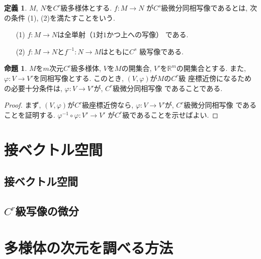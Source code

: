 \documentclass[a4j,12pt]{jarticle}
\theoremstyle{definition}
\newtheorem{definition}[theorem]{定義}
\newtheorem{proposition}[theorem]{命題}
\begin{document}
\begin{definition}\label{def:C^s deffeomorphism}
    $M$, $N$を$C^r$級多様体とする. $f:M\to N$
    が$C^s$級微分同相写像であるとは, 次の条件
    (1), (2)を満たすことをいう. 
    \begin{itemize}
        \item[(1)]
        $f:M\to N$は全単射（$1$対$1$かつ上への写像）
        である. 
        \item[(2)] 
        $f:M\to N$と$f^{-1}:N\to M$はともに$C^s$
        級写像である. 
    \end{itemize}
\end{definition}
\begin{proposition}\label{prop: cord-nabor condition}
    $M$を$m$次元$C^r$級多様体, $V$を$M$の開集合, 
    $V'$を$\mathbb{R}^m$の開集合とする. また, 
    $\varphi:V\to V'$を同相写像とする. 
    このとき, $(V,\varphi)$が$M$の$C^r$級
    座標近傍になるための必要十分条件は, 
    $\varphi:V\to V'$が, $C^r$級微分同相写像
    であることである. 
\end{proposition}
\begin{proof}
    まず, $(V,\varphi)$が$C^r$級座標近傍なら, 
    $\varphi:V\to V'$が, $C^r$級微分同相写像
    であることを証明する. 
    $\varphi ^{-1}\circ\varphi:V'\to V'$
    が$C^r$級であることを示せばよい.  

\end{proof}
%
\section{接ベクトル空間}
\subsection{接ベクトル空間}

\subsection{$C^r$級写像の微分}
\newpage
%
\section{多様体の次元を調べる方法}
\end{document}
